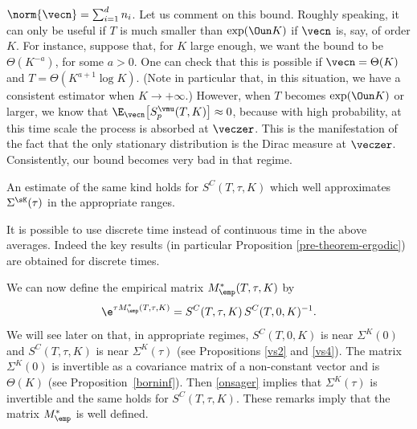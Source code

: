 $\norm{\vecn}=\sum_{i=1}^d n_i$.
Let us comment on this bound.
Roughly speaking, it can only be useful if $T$ is much smaller than $\exp(\Oun K)$ if $\vecn$ is, say, of order $K$.
For instance, suppose that, for $K$ large enough, we want the bound to be $\Theta(K^{-a})$, for some $a>0$. One can check that this is possible if
$\vecn=\Theta(K)$ and $T=\Theta(K^{a+1} \log K)$. (Note in particular that, in this situation, we have a consistent estimator when $K\to+\infty$.)
However, when $T$ becomes $\exp(\Oun K)$ or larger, we know that $\E_{\vecn}\bigl[S^{\vmu}_{p}(T,K)\bigr]\approx 0$, because with high
probability, at this time scale the process is absorbed at $\veczer$. This is the manifestation of the fact that the only stationary distribution is the Dirac
measure at $\veczer$. Consistently, our bound becomes very bad in that regime.

An estimate of the same kind holds for $S^{C}(T,\tau,K)$ which well approximates $\Sigma^{\sK}(\tau)$ in the appropriate ranges.

\begin{remark} It is possible to use discrete time instead of continuous time in the above averages. Indeed the key results (in particular Proposition
\ref{pre-theorem-ergodic}) are obtained for discrete times.
\end{remark}

We can now define the empirical matrix $M^{*}_\emp(T,\tau,K)$ by
\[
\e^{\tau M^{*}_\emp(T,\tau,K)}=S^{C}(T,\tau,K)\,S^{C}(T,0,K)^{-1}.
\]
We will see later on that, in appropriate regimes, $S^{C}(T,0,K)$ is near $\Sigma^K(0)$ and $S^{C}(T,\tau,K)$ is near $\Sigma^K(\tau)$
(see Propositions \ref{vs2} and \ref{vs4}). The matrix $\Sigma^K(0)$ is invertible as a covariance matrix of a non-constant vector and is $\Theta(K)$ (see Proposition~\ref{borninf}). Then \eqref{onsager} implies that $\Sigma^K(\tau)$ is invertible and the same holds for $S^{C}(T,\tau,K)$. These remarks imply
that the matrix $M^{*}_\emp$ is well defined.

